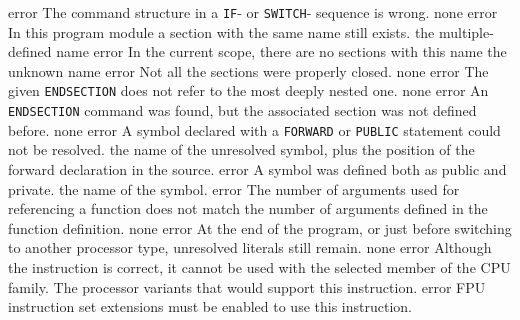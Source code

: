 \documentclass[12pt,twoside]{report}
\newcommand{\tty}[1]{{\tt #1}}
\begin{document}
\begin{description}
               {error}
               {The command structure in a \tty{IF}- or \tty{SWITCH}- sequence is
                wrong.}
               {none}
               {error}
               {In this program module a section with the same name still
                exists.}
               {the multiple-defined name}
               {error}
               {In the current scope, there are no sections with this name}
               {the unknown name}
               {error}
               {Not all the sections were properly closed.}
               {none}
               {error}
               {The given \tty{ENDSECTION} does not refer to the most
                deeply nested one.}
               {none}
               {error}
               {An \tty{ENDSECTION} command was found, but the associated section
                was not defined before.}
               {none}
               {error}
               {A symbol declared with a \tty{FORWARD} or \tty{PUBLIC} statement could
                not be resolved.}
               {the name of the unresolved symbol, plus the
                position of the forward declaration in the
                source.}
               {error}
               {A symbol was defined both as public and private.}
               {the name of the symbol.}
               {error}
               {The number of arguments used for referencing a function
                does not match the number of arguments defined in the
                function definition.}
               {none}
               {error}
               {At the end of the program, or just before switching to
                another processor type, unresolved literals still remain.}
               {none}
               {error}
               {Although the instruction is correct, it cannot be used with
                the selected member of the CPU family.}
               {The processor variants that would support this
                instruction.}
               {error}
               {FPU instruction set extensions must be enabled to
                use this instruction.}

\end{description}
\end{document}

